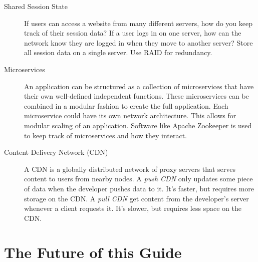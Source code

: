 \begin{description}
	\item[Shared Session State] If users can access a website from many different servers, how do you keep track of their session data? If a user logs in on one server, how can the network know they are logged in when they move to another server? Store all session data on a single server. Use RAID for redundancy.
	
	\item[Microservices] An application can be structured as a collection of microservices that have their own well-defined independent functions. These microservices can be combined in a modular fashion to create the full application. Each microservice could have its own network architecture. This allows for modular scaling of an application. Software like Apache Zookeeper is used to keep track of microservices and how they interact.
	
	\item[Content Delivery Network (CDN)] A CDN is a globally distributed network of proxy servers that serves content to users from nearby nodes. A \textit{push CDN} only updates some piece of data when the developer pushes data to it. It's faster, but requires more storage on the CDN. A \textit{pull CDN} get content from the developer's server whenever a client requests it. It's slower, but requires less space on the CDN.
\end{description}


\toclineskip
\section{The Future of this Guide}

\newpage



%




